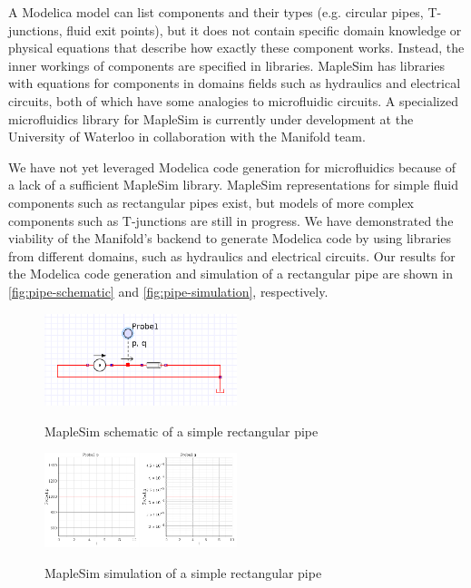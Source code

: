 A Modelica model can list components and their types (e.g. circular pipes, T-junctions, fluid exit points),
but it does not contain specific domain knowledge or physical equations that describe how exactly these
component works.
Instead, the inner workings of components are specified in libraries.
MapleSim has libraries with equations for components in domains fields such as hydraulics and electrical
circuits, both of which have some analogies to microfluidic circuits.
A specialized microfluidics library for MapleSim is currently under development at the University of Waterloo
in collaboration with the Manifold team.

We have not yet leveraged Modelica code generation for microfluidics because of a lack of a sufficient
MapleSim library.
MapleSim representations for simple fluid components such as rectangular pipes exist, but models of more complex components such as T-junctions are still in progress.
We have demonstrated the viability of the Manifold's backend to generate Modelica code by using
libraries from different domains, such as hydraulics and electrical circuits. Our results for the Modelica
code generation and simulation of a rectangular pipe are shown in \autoref{fig:pipe-schematic} and
\autoref{fig:pipe-simulation}, respectively.

\begin{figure}[!ht]
  \caption{MapleSim schematic of a simple rectangular pipe}
  \centering
    \includegraphics[width=0.5\textwidth]{img/simple-pipe.png}
	\label{fig:pipe-schematic}
\end{figure}
\begin{figure}[!ht]
  \caption{MapleSim simulation of a simple rectangular pipe}
  \centering
    \includegraphics[width=0.5\textwidth]{img/simple-pipe-simulation.png}
	\label{fig:pipe-simulation}
\end{figure}

